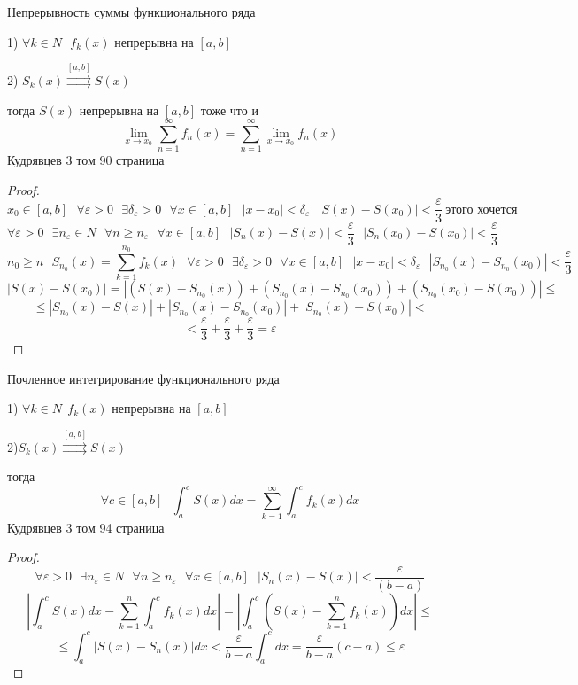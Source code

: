 \begin{title}[\Large]
  Непрерывность суммы функционального ряда
\end{title}

\begin{theorem}
  1) $\forall k \in N ~~~ f_k(x)$ непрерывна на $[a,b]$

  2) $S_k (x) \stackrel{[a,b]}{\rightrightarrows} S(x)$

  тогда $S(x)$ непрерывна на $[a,b]$ тоже что и
  $$
  \lim_{x \to x_0} \sum_{n=1}^{\infty} f_n (x) = \sum_{n=1}^{\infty}
  \lim_{x \to x_0} f_n(x)
  $$
  Кудрявцев 3 том 90 страница
\end{theorem}

\begin{proof}
  $$
  x_0 \in [a,b] ~~~ \forall \varepsilon > 0 ~~~ \exists \delta_{\varepsilon} > 0
   ~~~ \forall x \in [a,b] ~~~ |x - x_0| < \delta_{\varepsilon} ~~~
  |S(x) - S(x_0)| < \frac{\varepsilon}{3} ~ \text{этого хочется}
  $$
  $$
  \forall \varepsilon > 0 ~~~ \exists n_{\varepsilon} \in N ~~~ \forall n \ge
  n_{\varepsilon} ~~~ \forall x \in [a,b] ~~~ |S_n(x) - S(x)| <
  \frac{\varepsilon}{3} ~~~ |S_n(x_0) - S(x_0)| < \frac{\varepsilon}{3}
  $$
  $$
  n_0 \ge n ~~~ S_{n_0}(x) = \sum_{k=1}^{n_0} f_k(x) ~~~ \forall \varepsilon > 0
  ~~~ \exists \delta_{\varepsilon} > 0 ~~~ \forall x \in [a,b] ~~~ |x - x_0| <
  \delta_{\varepsilon} ~~~ |S_{n_0}(x) - S_{n_0}(x_0)| < \frac{\varepsilon}{3}
  $$
  $$
  |S(x) - S(x_0)| =  |(S(x) - S_{n_0}(x)) + (S_{n_0}(x) - S_{n_0}(x_0))
  + (S_{n_0}(x_0) - S(x_0))| \le
  $$
  $$
   \le |S_{n_0}(x) - S(x)| +
  |S_{n_0}(x) - S_{n_0}(x_0)| + |S_{n_0}(x) - S(x_0)| <
  $$
  $$
  < \frac{\varepsilon}{3} +
  \frac{\varepsilon}{3} + \frac{\varepsilon}{3} = \varepsilon
  $$
\end{proof}

\begin{title}[\Large]
  Почленное интегрирование функционального ряда
\end{title}

\begin{theorem}
  1) $\forall k \in N ~~ f_k(x)$ непрерывна на $[a,b]$

  2)$S_k(x) \stackrel{[a,b]}{\rightrightarrows} S(x)$

  тогда
  $$
  \forall c \in [a,b] ~~~ \int_a^c S(x)dx =
  \sum_{k=1}^{\infty} \int_a^c f_k(x)dx
  $$
  Кудрявцев 3 том 94 страница
\end{theorem}

\begin{proof}
  $$
  \forall \varepsilon  > 0 ~~~ \exists n_{\varepsilon} \in N ~~~
  \forall n \ge n_{\varepsilon} ~~~ \forall x \in[a,b] ~~~
  |S_n(x) - S(x)| < \frac{\varepsilon}{(b-a)}
  $$
  $$
  \left| \int_a^c S(x)dx - \sum_{k=1}^n \int_a^c f_k(x)dx \right| =
  \left| \int_a^c \left( S(x) - \sum_{k=1}^n f_k(x) \right)dx \right| \le
  $$
  $$
  \le \int_a^c |S(x) - S_n(x)|dx < \frac{\varepsilon}{b-a} \int_a^c dx =
  \frac{\varepsilon}{b-a}(c-a) \le \varepsilon
  $$
\end{proof}

